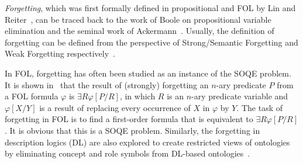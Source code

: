 \documentclass{article}
\begin{document}
\emph{Forgetting}, %
which was first formally defined in propositional and FOL by Lin and Reiter~\cite{lin1994forget,eiter2019brief}, can be traced back to the work of Boole on propositional
variable elimination and the seminal work of Ackermann~\cite{ackermann1935untersuchungen}.
Usually, the definition of forgetting can be defined from the perspective of Strong/Semantic Forgetting and Weak Forgetting  respectively~\cite{Zhang:KR:2010}.


In FOL, forgetting has often been studied as an instance of the SOQE problem. It is shown  in~\cite{lin1994forget} that the result of (strongly) forgetting an $n$-ary predicate $P$ from a FOL formula $\varphi$ is $\exists R \varphi[P/R]$, in which $R$ is an $n$-ary predicate variable and $\varphi[X/Y]$ is a result of replacing every occurrence of $X$ in $\varphi$ by $Y$.
The task of forgetting in FOL is to find a first-order formula that is equivalent to $\exists R \varphi[P/R]$.
It is obvious that this is a SOQE problem.
Similarly, the forgetting in description logics (DL) are also explored to create restricted views
of ontologies by eliminating concept and role symbols from DL-based
ontologies~\cite{Wang:AMAI:2010,Lutz:IJCAI:2011,Zhao:2017:IJCAI}.
\end{document}
